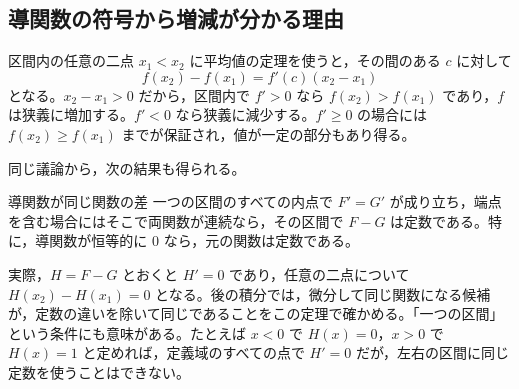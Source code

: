 \subsection{導関数の符号から増減が分かる理由}
区間内の任意の二点 $x_1<x_2$ に平均値の定理を使うと，その間のある $c$ に対して
\[
 f(x_2)-f(x_1)=f'(c)(x_2-x_1)
\]
となる。$x_2-x_1>0$ だから，区間内で $f'>0$ なら $f(x_2)>f(x_1)$ であり，$f$ は狭義に増加する。$f'<0$ なら狭義に減少する。$f'\ge0$ の場合には $f(x_2)\ge f(x_1)$ までが保証され，値が一定の部分もあり得る。

同じ議論から，次の結果も得られる。
\begin{theorem}{導関数が同じ関数の差}\label{定理:導関数同じ}
一つの区間のすべての内点で $F'=G'$ が成り立ち，端点を含む場合にはそこで両関数が連続なら，その区間で $F-G$ は定数である。特に，導関数が恒等的に $0$ なら，元の関数は定数である。
\end{theorem}

実際，$H=F-G$ とおくと $H'=0$ であり，任意の二点について $H(x_2)-H(x_1)=0$ となる。後の積分では，微分して同じ関数になる候補が，定数の違いを除いて同じであることをこの定理で確かめる。「一つの区間」という条件にも意味がある。たとえば $x<0$ で $H(x)=0$，$x>0$ で $H(x)=1$ と定めれば，定義域のすべての点で $H'=0$ だが，左右の区間に同じ定数を使うことはできない。

